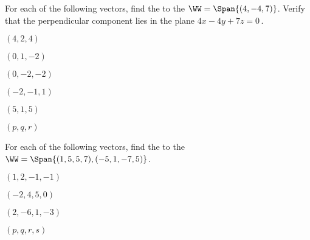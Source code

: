 \begin{exercise}  
For each of the following vectors, find the  to the  \(\WW=\Span\{(4,-4,7)\}\).  
Verify that the perpendicular component lies in the plane \(4x-4y+7z=0\)\,.
\begin{Parts}
\item \((4,2,4)\)

\item \((0,1,-2)\)

\begin{reduce}
\item \((0,-2,-2)\)

\item \((-2,-1,1)\)
\end{reduce}

\item \((5,1,5)\)

\item \((p,q,r)\)

\end{Parts}
\end{exercise}




\begin{exercise}  
For each of the following vectors, find the  to the  \(\WW=\Span\{(1,5,5,7), (-5,1,-7,5)\}\).  

\begin{Parts}
\item \((1,2,-1,-1)\)

\item \((-2,4,5,0)\)

\item \((2,-6,1,-3)\)

\item \((p,q,r,s)\)

\end{Parts}
\end{exercise}




